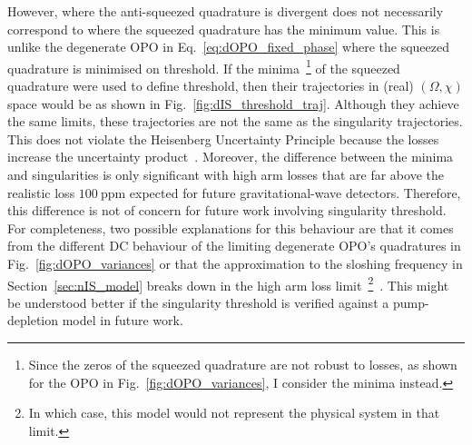 However, where the anti-squeezed quadrature is divergent does not necessarily correspond to where the squeezed quadrature has the minimum value. This is unlike the degenerate OPO in Eq.~\ref{eq:dOPO_fixed_phase} where the squeezed quadrature is minimised on threshold.
If the minima~\footnote{Since the zeros of the squeezed quadrature are not robust to losses, as shown for the OPO in Fig.~\ref{fig:dOPO_variances}, I consider the minima instead.} of the squeezed quadrature were used to define threshold, then their trajectories in (real) $(\Omega,\chi)$ space would be as shown in Fig.~\ref{fig:dIS_threshold_traj}. Although they achieve the same limits, these trajectories are not the same as the singularity trajectories.
This does not violate the Heisenberg Uncertainty Principle because the losses increase the uncertainty product~\cite{}. %
Moreover, the difference between the minima and singularities is only significant with high arm losses that are far above the realistic loss $100~\text{ppm}$ expected for future gravitational-wave detectors.
Therefore, this difference is not of concern for future work involving singularity threshold.
For completeness, two possible explanations for this behaviour are that it comes from the different DC behaviour of the limiting degenerate OPO's quadratures in Fig.~\ref{fig:dOPO_variances} or that the approximation to the sloshing frequency in Section~\ref{sec:nIS_model} breaks down in the high arm loss limit~\footnote{In which case, this model would not represent the physical system in that limit.}~\cite{}. This might be understood better if the singularity threshold is verified against a pump-depletion model in future work.


